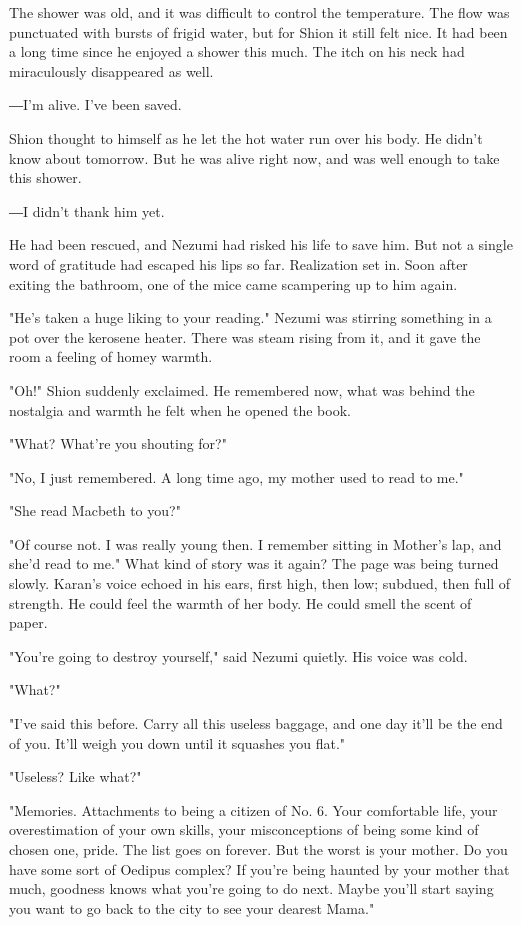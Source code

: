 The shower was old, and it was difficult to control the temperature. The
flow was punctuated with bursts of frigid water, but for Shion it still
felt nice. It had been a long time since he enjoyed a shower this much.
The itch on his neck had miraculously disappeared as well.

―I'm alive. I've been saved.

Shion thought to himself as he let the hot water run over his body. He
didn't know about tomorrow. But he was alive right now, and was well
enough to take this shower.

―I didn't thank him yet.

He had been rescued, and Nezumi had risked his life to save him. But not
a single word of gratitude had escaped his lips so far. Realization set
in. Soon after exiting the bathroom, one of the mice came scampering up
to him again.

"He's taken a huge liking to your reading." Nezumi was stirring
something in a pot over the kerosene heater. There was steam rising from
it, and it gave the room a feeling of homey warmth.

"Oh!" Shion suddenly exclaimed. He remembered now, what was behind the
nostalgia and warmth he felt when he opened the book.

"What? What're you shouting for?"

"No, I just remembered. A long time ago, my mother used to read to me."

"She read Macbeth to you?"

"Of course not. I was really young then. I remember sitting in Mother's
lap, and she'd read to me." What kind of story was it again? The page
was being turned slowly. Karan's voice echoed in his ears, first high,
then low; subdued, then full of strength. He could feel the warmth of
her body. He could smell the scent of paper.

"You're going to destroy yourself," said Nezumi quietly. His voice was
cold.

"What?"

"I've said this before. Carry all this useless baggage, and one day
it'll be the end of you. It'll weigh you down until it squashes you
flat."

"Useless? Like what?"

"Memories. Attachments to being a citizen of No. 6. Your comfortable
life, your overestimation of your own skills, your misconceptions of
being some kind of chosen one, pride. The list goes on forever. But the
worst is your mother. Do you have some sort of Oedipus complex? If
you're being haunted by your mother that much, goodness knows what
you're going to do next. Maybe you'll start saying you want to go back
to the city to see your dearest Mama."

